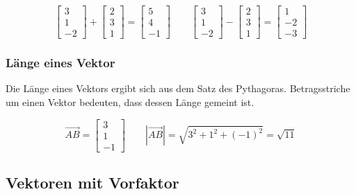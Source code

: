 \begin{equation*}
    \begin{bmatrix}
        3 \\
        1 \\
        -2
    \end{bmatrix}
    +
    \begin{bmatrix}
        2 \\
        3 \\
        1
    \end{bmatrix}
    =
    \begin{bmatrix}
        5 \\
        4 \\
        -1
    \end{bmatrix}
    \qquad
    \begin{bmatrix}
        3 \\
        1 \\
        -2
    \end{bmatrix}
    -
    \begin{bmatrix}
        2 \\
        3 \\
        1
    \end{bmatrix}
    =
    \begin{bmatrix}
        1 \\
        -2 \\
        -3
    \end{bmatrix}
\end{equation*}

\subsubsection{Länge eines Vektor}

Die Länge eines Vektors ergibt sich aus dem Satz des Pythagoras.
Betragsstriche um einen Vektor bedeuten, dass dessen Länge gemeint ist.

\begin{equation*}
    \overrightarrow{AB} = \begin{bmatrix}
        3 \\
        1 \\
        -1
    \end{bmatrix}
    \qquad | \overrightarrow{AB} | = \sqrt{3^2 + 1^2 + (-1)^2} = \sqrt{11}
\end{equation*}

\subsection{Vektoren mit Vorfaktor}

